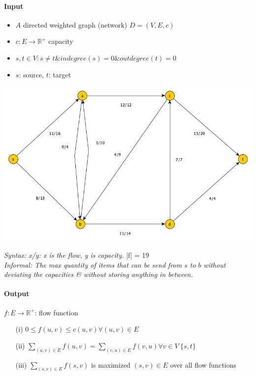 \paragraph{Input} 
\begin{itemize}
\item  $A$ directed weighted graph (network) $D = (V,E,c)$
\item $c: E \rightarrow  \mathbb{R}^+$ capacity
\item $s,t \in V: s \neq t \& indegree(s) = 0 \& outdegree(t) = 0$
\item $s$: source, $t$: target
\end{itemize}
\begin{center}
	\includegraphics[scale=0.5]{img/graph5}
\end{center}
\textit{Syntax: x/y: x is the flow, y is capacity.} |f| = 19 \\
\textit{Informal: The max quantity of items that can be send from $s$ to $b$ without deviating the capacities \& without storing anything in between.}

\paragraph{Output}
$f: E \rightarrow \mathbb{R}^+$: flow function

\begin{itemize}
\item[(i)] $0 \leq f(u,v) \leq c(u,v) \forall (u,v) \in E$

\item[(ii)] $\sum_{(u,v)\in E}f(u,v) = \sum_{(v,u) \in E}f(v,u) \forall v  \in V \ \{s,t\}$

\item[(iii)] $\sum_{(s,v) \in E} f(s,v)$ is maximized $ (s,v)\in E$ over all flow functions

\end{itemize}

